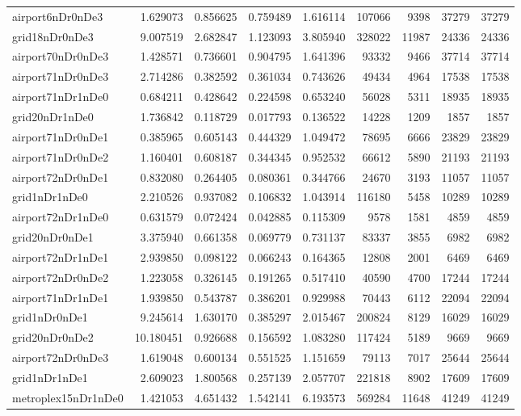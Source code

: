 \documentclass[../../../thesis.tex]{subfiles}
\begin{document}
\begin{longtable}{|l|r|r|r|r|r|r|r|r|}
airport6nDr0nDe3 & 1.629073 & 0.856625 & 0.759489 & 1.616114 & 107066 & 9398 & 37279 & 37279 \\
grid18nDr0nDe3 & 9.007519 & 2.682847 & 1.123093 & 3.805940 & 328022 & 11987 & 24336 & 24336 \\
airport70nDr0nDe3 & 1.428571 & 0.736601 & 0.904795 & 1.641396 & 93332 & 9466 & 37714 & 37714 \\
airport71nDr0nDe3 & 2.714286 & 0.382592 & 0.361034 & 0.743626 & 49434 & 4964 & 17538 & 17538 \\
airport71nDr1nDe0 & 0.684211 & 0.428642 & 0.224598 & 0.653240 & 56028 & 5311 & 18935 & 18935 \\
grid20nDr1nDe0 & 1.736842 & 0.118729 & 0.017793 & 0.136522 & 14228 & 1209 & 1857 & 1857 \\
airport71nDr0nDe1 & 0.385965 & 0.605143 & 0.444329 & 1.049472 & 78695 & 6666 & 23829 & 23829 \\
airport71nDr0nDe2 & 1.160401 & 0.608187 & 0.344345 & 0.952532 & 66612 & 5890 & 21193 & 21193 \\
airport72nDr0nDe1 & 0.832080 & 0.264405 & 0.080361 & 0.344766 & 24670 & 3193 & 11057 & 11057 \\
grid1nDr1nDe0 & 2.210526 & 0.937082 & 0.106832 & 1.043914 & 116180 & 5458 & 10289 & 10289 \\
airport72nDr1nDe0 & 0.631579 & 0.072424 & 0.042885 & 0.115309 & 9578 & 1581 & 4859 & 4859 \\
grid20nDr0nDe1 & 3.375940 & 0.661358 & 0.069779 & 0.731137 & 83337 & 3855 & 6982 & 6982 \\
airport72nDr1nDe1 & 2.939850 & 0.098122 & 0.066243 & 0.164365 & 12808 & 2001 & 6469 & 6469 \\
airport72nDr0nDe2 & 1.223058 & 0.326145 & 0.191265 & 0.517410 & 40590 & 4700 & 17244 & 17244 \\
airport71nDr1nDe1 & 1.939850 & 0.543787 & 0.386201 & 0.929988 & 70443 & 6112 & 22094 & 22094 \\
grid1nDr0nDe1 & 9.245614 & 1.630170 & 0.385297 & 2.015467 & 200824 & 8129 & 16029 & 16029 \\
grid20nDr0nDe2 & 10.180451 & 0.926688 & 0.156592 & 1.083280 & 117424 & 5189 & 9669 & 9669 \\
airport72nDr0nDe3 & 1.619048 & 0.600134 & 0.551525 & 1.151659 & 79113 & 7017 & 25644 & 25644 \\
grid1nDr1nDe1 & 2.609023 & 1.800568 & 0.257139 & 2.057707 & 221818 & 8902 & 17609 & 17609 \\
metroplex15nDr1nDe0 & 1.421053 & 4.651432 & 1.542141 & 6.193573 & 569284 & 11648 & 41249 & 41249 \\

\end{longtable}
\end{document}
